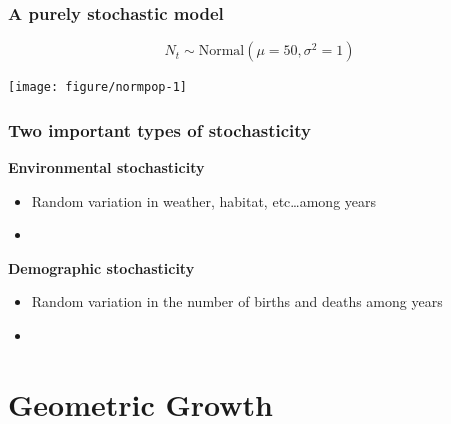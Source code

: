 \documentclass[color=usenames,dvipsnames]{beamer}\usepackage[]{graphicx}\usepackage[]{color}
\begin{document}
\begin{frame}[fragile]
  \frametitle{A purely stochastic model}
  \vspace{-3mm}
  \[
    N_t \sim \mbox{Normal}(\mu=50, \sigma^2=1)
  \]
  \vspace{-8mm}

\begin{center}
  \texttt{[image: figure/normpop-1]}
\end{center}
\end{frame}



\begin{frame}
  \frametitle{Two important types of stochasticity}
  {\bf Environmental stochasticity}
  \begin{itemize}
    \item Random variation in weather, habitat, etc\dots among years
    \item[]
  \end{itemize}
  \pause
  {\bf Demographic stochasticity}
  \begin{itemize}
    \item Random variation in the number of births and deaths among years
    \item[]
  \end{itemize}
\end{frame}







\section{Geometric Growth}
\end{document}

